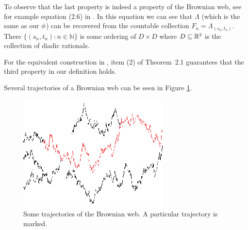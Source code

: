 {To observe that the last property is indeed a property of the Brownian
web, see for example equation (2.6) in \cite{toth-werner}.  In this
equation we can see that $\Lambda$ (which is the same as our
$\phi$) can be recovered from the countable collection $F_n =
\Lambda_{(s_n,t_n)}$.  There $\{(s_n,t_n) : n \in \mathbb{N}\}$ is
some ordering of $D \times D$ where $D \subseteq \mathbb{R}^2$ is the
collection of diadic rationals.

For the equivalent construction in \cite{fontes-et-al}, item (2) of
Theorem~2.1 guarantees that the third property in our definition
holds.

  Several trajectories of a Brownian web can be seen in Figure
  \ref{fig:bw-trajectories}.

\begin{figure}
   \centering
   \includegraphics[scale=2]{sometraj.eps}
   \caption{Some trajectories of the Brownian web. A particular trajectory is marked.}
  \label{fig:bw-trajectories}
\end{figure}
}
